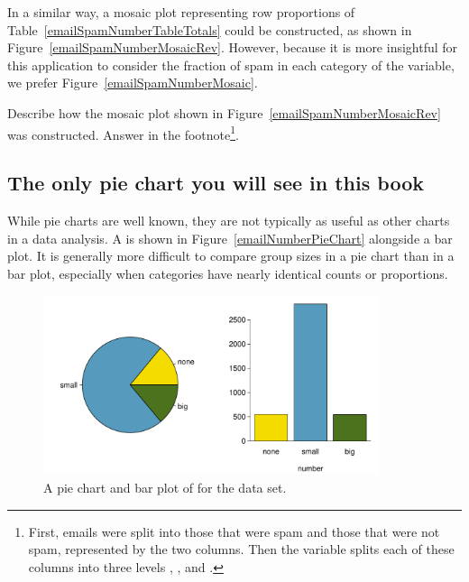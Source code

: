 In a similar way, a mosaic plot representing row proportions of Table~\ref{emailSpamNumberTableTotals} could be constructed, as shown in Figure~\ref{emailSpamNumberMosaicRev}. However, because it is more insightful for this application to consider the fraction of spam in each category of the  variable, we prefer Figure~\ref{emailSpamNumberMosaic}.

\begin{exercise}
Describe how the mosaic plot shown in Figure~\ref{emailSpamNumberMosaicRev} was constructed. Answer in the footnote\footnote{First, emails were split into those that were spam and those that were not spam, represented by the two columns. Then the  variable splits each of these columns into three levels , , and .}.
\end{exercise}

\subsection{The only pie chart you will see in this book}

While pie charts are well known, they are not typically as useful as other charts in a data analysis. A  is shown in Figure~\vref{emailNumberPieChart} alongside a bar plot. It is generally more difficult to compare group sizes in a pie chart than in a bar plot, especially when categories have nearly identical counts or proportions. %
\begin{figure}%
   \centering
   \includegraphics[width=0.88\textwidth]{01/figures/emailNumberPieChart/emailNumberPieChart}
   \caption{A pie chart and bar plot of  for the  data set.}
   \label{emailNumberPieChart}%
\end{figure}

